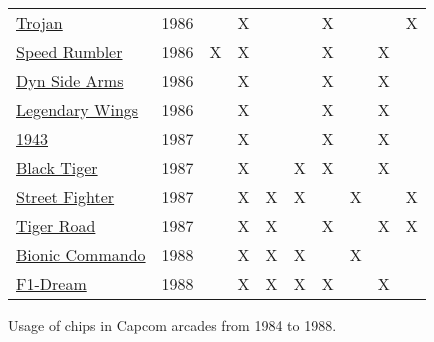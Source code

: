 \begin{figure}[H]
{\begin{tabularx}{\textwidth}{Xccccccccc}
  \toprule    
\href{https://www.youtube.com/watch?v=L1FVWdlQNG8}{Trojan}
                & 1986          &               &      X       &              &              &       X       &               &               &       X       \\
\href{https://www.youtube.com/watch?v=57lg9pFUgco}{Speed Rumbler}
                & 1986          &       X       &      X       &              &              &       X       &               &       X       &               \\
\href{https://www.youtube.com/watch?v=0QyLx94PMio}{Dyn Side Arms}
                & 1986          &               &      X       &              &              &       X       &               &       X       &               \\
\href{https://www.youtube.com/watch?v=0f4jWQyf-fs}{Legendary Wings}
                & 1986          &               &      X       &              &              &       X       &               &       X       &               \\
  \toprule    
\href{https://www.youtube.com/watch?v=kntCwchJWfw}{1943}
                & 1987          &               &      X       &              &              &       X       &               &       X       &               \\
\href{https://www.youtube.com/watch?v=ZzKStmMAiHM}{Black Tiger}
                & 1987          &               &      X       &              &      X       &       X       &               &       X       &               \\
\href{https://www.youtube.com/watch?v=kVLCv-YgWco}{Street Fighter}
                & 1987          &               &      X       &      X       &      X       &               &       X       &               &       X       \\
\href{https://www.youtube.com/watch?v=1ZtwOGN-ZeE}{Tiger Road}
                & 1987          &               &      X       &      X       &              &       X       &               &       X       &       X       \\
  \toprule    
\href{https://www.youtube.com/watch?v=zG620nr7vko}{Bionic Commando}
                & 1988          &               &      X       &      X       &      X       &               &       X       &               &               \\
\href{https://www.youtube.com/watch?v=zG620nr7vko}{F1-Dream}
                & 1988          &               &      X       &      X       &      X       &       X       &               &       X       &               \\
  \toprule    
\end{tabularx}%
}\caption*{Usage of chips in Capcom arcades from 1984 to 1988\cite{cps0chipslist}.}
\label{fig:capcom_pcbs}
\end{figure}


